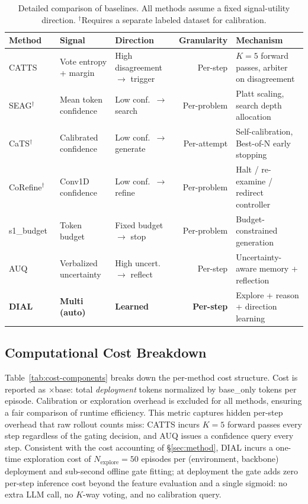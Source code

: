 \begin{table}[h!]
\caption{Detailed comparison of baselines. All methods assume a
fixed signal-utility direction.
$^\dagger$Requires a separate labeled dataset for calibration.}
\label{tab:baseline-detail}
\centering\small
\renewcommand{\arraystretch}{1.15}
\begin{tabularx}{\textwidth}{l W W N W}
\toprule
Method & Signal & Direction & Granularity & Mechanism \\
\midrule
CATTS~\cite{catts2026} & Vote entropy + margin
  & High disagreement $\to$ trigger
  & Per-step & $K{=}5$ forward passes, arbiter on disagreement \\
SEAG$^\dagger$~\cite{seag2025} & Mean token confidence
  & Low conf.\ $\to$ search
  & Per-problem & Platt scaling, search depth allocation \\
CaTS$^\dagger$~\cite{cats2025} & Calibrated confidence
  & Low conf.\ $\to$ generate
  & Per-attempt & Self-calibration, Best-of-N early stopping \\
CoRefine$^\dagger$~\cite{corefine2026} & Conv1D confidence
  & Low conf.\ $\to$ refine
  & Per-problem & Halt / re-examine / redirect controller \\
s1\_budget~\cite{s1_2025} & Token budget
  & Fixed budget $\to$ stop
  & Per-problem & Budget-constrained generation \\
AUQ~\cite{auq2026} & Verbalized uncertainty
  & High uncert.\ $\to$ reflect
  & Per-step & Uncertainty-aware memory + reflection \\
\midrule
\textbf{DIAL} & \textbf{Multi (auto)} & \textbf{Learned}
  & \textbf{Per-step}
  & Explore + reason + direction learning \\
\bottomrule
\end{tabularx}
\end{table}

\subsection{Computational Cost Breakdown}
\label{app:cost}

Table~\ref{tab:cost-components} breaks down the per-method cost
structure. Cost is reported as $\times$base: total
\emph{deployment} tokens normalized by base\_only tokens per
episode. Calibration or exploration overhead is excluded for all
methods, ensuring a fair comparison of runtime efficiency. This
metric captures hidden per-step overhead that raw rollout counts
miss: CATTS incurs $K{=}5$ forward passes every step regardless
of the gating decision, and AUQ issues a confidence query every
step. Consistent with the cost accounting of \S\ref{sec:method},
DIAL incurs a one-time exploration cost of
$N_{\text{explore}}{=}50$ episodes per (environment, backbone)
deployment and sub-second offline gate fitting; at deployment the
gate adds zero per-step inference cost beyond the feature
evaluation and a single sigmoid: no extra LLM call, no $K$-way
voting, and no calibration query.

